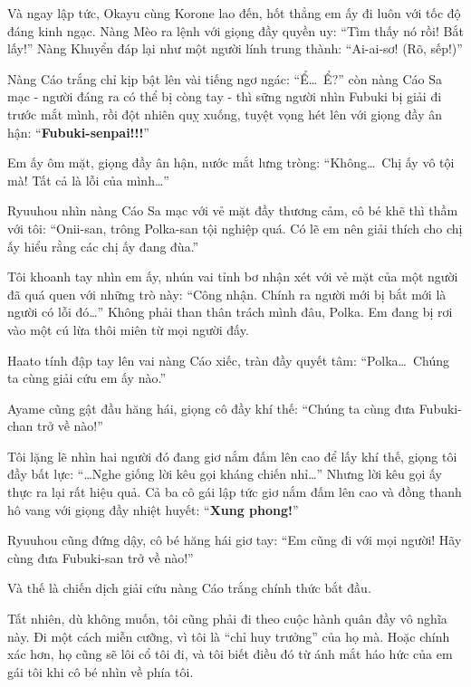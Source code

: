 \documentclass[../main.tex]{subfiles}
\begin{document}
Và ngay lập tức, Okayu cùng Korone lao đến, hốt thẳng em ấy đi luôn với tốc độ đáng kinh ngạc. Nàng Mèo ra lệnh với giọng đầy quyền uy: ``Tìm thấy nó rồi! Bắt lấy!'' Nàng Khuyển đáp lại như một người lính trung thành: ``Ai-ai-sơ! (Rõ, sếp!)''

Nàng Cáo trắng chỉ kịp bật lên vài tiếng ngơ ngác: ``Ể\dots\ Ể?'' còn nàng Cáo Sa mạc - người đáng ra có thể bị còng tay - thì sững người nhìn Fubuki bị giải đi trước mắt mình, rồi đột nhiên quỵ xuống, tuyệt vọng hét lên với giọng đầy ân hận: ``\textbf{Fubuki-senpai!!!}''


Em ấy ôm mặt, giọng đầy ân hận, nước mắt lưng tròng: ``Không\dots\ Chị ấy vô tội mà! Tất cả là lỗi của mình\dots''

Ryuuhou nhìn nàng Cáo Sa mạc với vẻ mặt đầy thương cảm, cô bé khẽ thì thầm với tôi: ``Onii-san, trông Polka-san tội nghiệp quá. Có lẽ em nên giải thích cho chị ấy hiểu rằng các chị ấy đang đùa.''

Tôi khoanh tay nhìn em ấy, nhún vai tỉnh bơ nhận xét với vẻ mặt của một người đã quá quen với những trò này: ``Công nhận. Chính ra người mới bị bắt mới là người có lỗi đó\dots'' Không phải than thân trách mình đâu, Polka. Em đang bị rơi vào một cú lừa thôi miên từ mọi người đấy.

Haato tính đập tay lên vai nàng Cáo xiếc, tràn đầy quyết tâm: ``Polka\dots\ Chúng ta cùng giải cứu em ấy nào.''

Ayame cũng gật đầu hăng hái, giọng cô đầy khí thế: ``Chúng ta cùng đưa Fubuki-chan trở về nào!''

Tôi lặng lẽ nhìn hai người đó đang giơ nắm đấm lên cao để lấy khí thế, giọng tôi đầy bất lực: ``\dots Nghe giống lời kêu gọi kháng chiến nhỉ\dots'' Nhưng lời kêu gọi ấy thực ra lại rất hiệu quả. Cả ba cô gái lập tức giơ nắm đấm lên cao và đồng thanh hô vang với giọng đầy nhiệt huyết: ``\textbf{Xung phong!}''

Ryuuhou cũng đứng dậy, cô bé hăng hái giơ tay: ``Em cũng đi với mọi người! Hãy cùng đưa Fubuki-san trở về nào!''

Và thế là chiến dịch giải cứu nàng Cáo trắng chính thức bắt đầu.

Tất nhiên, dù không muốn, tôi cũng phải đi theo cuộc hành quân đầy vô nghĩa này. Đi một cách miễn cưỡng, vì tôi là ``chỉ huy trưởng'' của họ mà. Hoặc chính xác hơn, họ cũng sẽ lôi cổ tôi đi, và tôi biết điều đó từ ánh mắt háo hức của em gái tôi khi cô bé nhìn về phía tôi.

\ct
\end{document}
